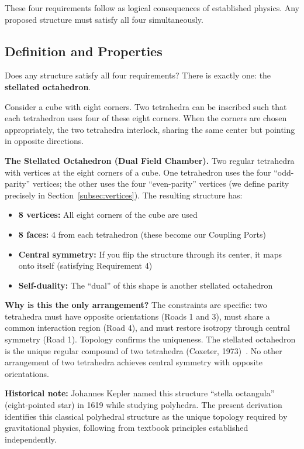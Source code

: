 \documentclass[aps,prd,preprint,superscriptaddress,showpacs,preprintnumbers,amsmath,amssymb,nofootinbib]{revtex4-2}
\begin{document}
These four requirements follow as logical consequences of established physics. Any proposed structure must satisfy all four simultaneously.

\subsection{Definition and Properties}
\label{subsec:definition}

Does any structure satisfy all four requirements? There is exactly one: the \textbf{stellated octahedron}.

Consider a cube with eight corners. Two tetrahedra can be inscribed such that each tetrahedron uses four of these eight corners. When the corners are chosen appropriately, the two tetrahedra interlock, sharing the same center but pointing in opposite directions.

\textbf{The Stellated Octahedron (Dual Field Chamber).} Two regular tetrahedra with vertices at the eight corners of a cube. One tetrahedron uses the four ``odd-parity'' vertices; the other uses the four ``even-parity'' vertices (we define parity precisely in Section~\ref{subsec:vertices}). The resulting structure has:
\begin{itemize}
\item \textbf{8 vertices:} All eight corners of the cube are used
\item \textbf{8 faces:} 4 from each tetrahedron (these become our Coupling Ports)
\item \textbf{Central symmetry:} If you flip the structure through its center, it maps onto itself (satisfying Requirement 4)
\item \textbf{Self-duality:} The ``dual'' of this shape is another stellated octahedron
\end{itemize}

\textbf{Why is this the only arrangement?} The constraints are specific: two tetrahedra must have opposite orientations (Roads 1 and 3), must share a common interaction region (Road 4), and must restore isotropy through central symmetry (Road 1). Topology confirms the uniqueness. The stellated octahedron is the unique regular compound of two tetrahedra (Coxeter, 1973)~\cite{coxeter1973}. No other arrangement of two tetrahedra achieves central symmetry with opposite orientations.

\textbf{Historical note:} Johannes Kepler named this structure ``stella octangula'' (eight-pointed star) in 1619 while studying polyhedra. The present derivation identifies this classical polyhedral structure as the unique topology required by gravitational physics, following from textbook principles established independently.
\end{document}
